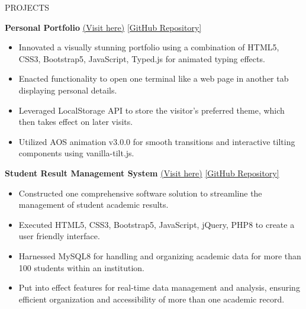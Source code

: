 \documentclass{resume} %
\begin{document}
\begin{rSection}{PROJECTS}
    \vspace{-1.15em}
    
    \item \textbf{Personal Portfolio} {\href{https://arkapg211002.github.io/}{(Visit here)}} {\href{https://github.com/arkapg211002/arkapg211002.github.io}{[GitHub Repository]}}
    \begin{itemize}
    \setlength\itemsep{-0.5em}
    \item Innovated a visually stunning portfolio using a combination of HTML5, CSS3, Bootstrap5, JavaScript, Typed.js for animated typing effects.
    \item Enacted functionality to open one terminal like a web page in another tab displaying personal details.
    \item Leveraged LocalStorage API to store the visitor’s preferred theme, which then takes effect on later visits.
    \item Utilized AOS animation v3.0.0 for smooth transitions and interactive tilting components using vanilla-tilt.js.
    \end{itemize}

    \item \textbf{Student Result Management System} {\href{https://arkaphpcrud.000webhostapp.com/index.php}{(Visit here)}}
    {\href{https://github.com/arkapg211002/Student-Result-Management-System}{[GitHub Repository]}}
    \begin{itemize}
    \setlength\itemsep{-0.5em}
    \item Constructed one comprehensive software solution to streamline the management of student academic results.
    \item Executed HTML5, CSS3, Bootstrap5, JavaScript, jQuery, PHP8 to create a user friendly interface.
    \item Harnessed MySQL8 for handling and organizing academic data for more than 100 students within an institution.
    \item Put into effect features for real-time data management and analysis, ensuring efficient organization and accessibility of more than one academic record.
    \end{itemize}


\end{rSection}
\end{document}
